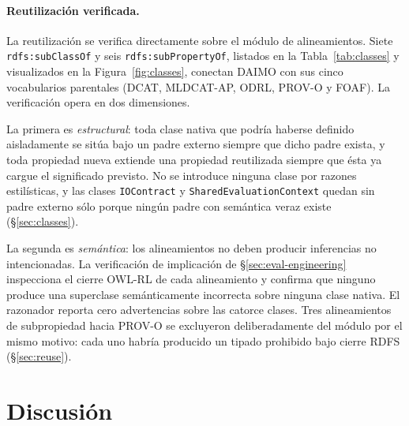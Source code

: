 \documentclass[Afour,sagev,times]{sagej}
\newcommand{\code}[1]{\texttt{#1}}
\begin{document}
\paragraph{Reutilización verificada.}\label{sec:eval-reuse}

La reutilización se verifica directamente sobre el módulo de alineamientos. Siete \code{rdfs:subClassOf} y seis \code{rdfs:subPropertyOf}, listados en la Tabla~\ref{tab:classes} y visualizados en la Figura~\ref{fig:classes}, conectan DAIMO con sus cinco vocabularios parentales (DCAT, MLDCAT-AP, ODRL, PROV-O y FOAF). La verificación opera en dos dimensiones.

La primera es \emph{estructural}: toda clase nativa que podría haberse definido aisladamente se sitúa bajo un padre externo siempre que dicho padre exista, y toda propiedad nueva extiende una propiedad reutilizada siempre que ésta ya cargue el significado previsto. No se introduce ninguna clase por razones estilísticas, y las clases \code{IOContract} y \code{SharedEvaluationContext} quedan sin padre externo sólo porque ningún padre con semántica veraz existe (§\ref{sec:classes}).

La segunda es \emph{semántica}: los alineamientos no deben producir inferencias no intencionadas. La verificación de implicación de §\ref{sec:eval-engineering} inspecciona el cierre OWL-RL de cada alineamiento y confirma que ninguno produce una superclase semánticamente incorrecta sobre ninguna clase nativa. El razonador reporta cero advertencias sobre las catorce clases. Tres alineamientos de subpropiedad hacia PROV-O se excluyeron deliberadamente del módulo por el mismo motivo: cada uno habría producido un tipado prohibido bajo cierre RDFS (§\ref{sec:reuse}).

\section{Discusión}\label{sec:discussion}
\end{document}
